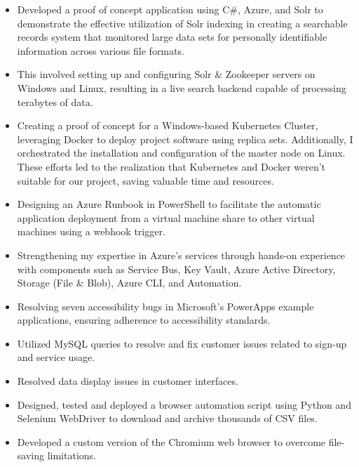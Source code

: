 \documentclass[11pt,sans]{moderncv}
\begin{document}
\begin{itemize}
\item Developed a proof of concept application using C\#, Azure, and Solr to demonstrate the effective utilization of Solr indexing in creating a searchable records system that monitored large data sets for personally identifiable information across various file formats. 
\item This involved setting up and configuring Solr \& Zookeeper servers on Windows and Linux, resulting in a live search backend capable of processing terabytes of data.
\item Creating a proof of concept for a Windows-based Kubernetes Cluster, leveraging Docker to deploy project software using replica sets. Additionally, I orchestrated the installation and configuration of the master node on Linux. These efforts led to the realization that Kubernetes and Docker weren't suitable for our project, saving valuable time and resources.
\item Designing an Azure Runbook in PowerShell to facilitate the automatic application deployment from a virtual machine share to other virtual machines using a webhook trigger.
\item Strengthening my expertise in Azure's services through hands-on experience with components such as Service Bus, Key Vault, Azure Active Directory, Storage (File \& Blob), Azure CLI, and Automation.
\item Resolving seven accessibility bugs in Microsoft's PowerApps example applications, ensuring adherence to accessibility standards.\newline{}
\end{itemize}
\newline{}
\begin{itemize}
\item Utilized MySQL queries to resolve and fix customer issues related to sign-up and service usage.
\item Resolved data display issues in customer interfaces.\newline{}
\end{itemize}
\newline{}
\begin{itemize}
\item Designed, tested and deployed a browser automation script using Python and Selenium WebDriver to download and archive thousands of CSV files.
\item Developed a custom version of the Chromium web browser to overcome file-saving limitations.
\end{itemize}
\end{document}
